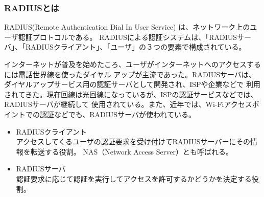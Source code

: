 \documentclass[11pt,a4j,titlepage]{jreport}
\begin{document}
\subsubsection*{RADIUSとは}
RADIUS(Remote Authentication Dial In User Service) \cite{RFC2865}は、ネットワーク上のユーザ認証プロトコルである。
RADIUSによる認証システムは、「RADIUSサーバ」、「RADIUSクライアント」、「ユーザ」の３つの要素で構成されている。

インターネットが普及を始めたころ、ユーザがインターネットへのアクセスするには電話世界線を使ったダイヤル
アップが主流であった。RADIUSサーバは、ダイヤルアップサービス用の認証サーバとして開発され、ISPや企業などで
利用されてきた。現在回線は光回線になっているが、ISPの認証サービスなどでは、RADIUSサーバが継続して
使用されている。また、近年では、Wi-Fiアクセスポイントでの認証などでも、RADIUSサーバが使われている。

\begin{itemize}
    \setlength{\parskip}{0.05cm} %
    \setlength{\itemsep}{0.05cm} 
    \item RADIUSクライアント\mbox{}\\
    アクセスしてくるユーザの認証要求を受け付けてRADIUSサーバーにその情報を転送する役割。
    NAS（Network Access Server）とも呼ばれる。
    \item RADIUSサーバ\mbox{}\\
    認証要求に応じて認証を実行してアクセスを許可するかどうかを決定する役割。
\end{itemize}
\end{document}
